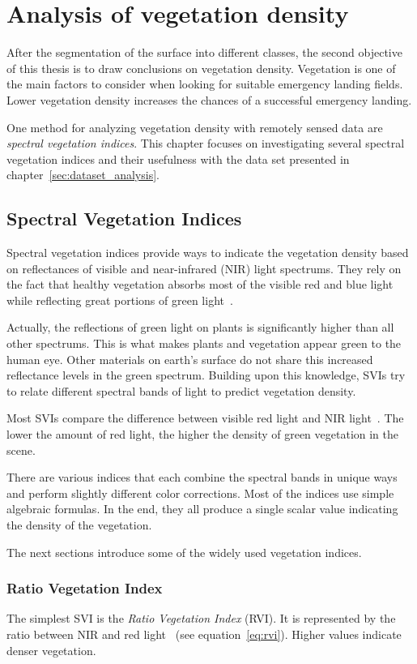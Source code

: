\section{Analysis of vegetation density}
\label{sec:vegetation_analysis}
After the segmentation of the surface into different classes, the second objective of this thesis is to draw conclusions on vegetation density. Vegetation is one of the main factors to consider when looking for suitable emergency landing fields. Lower vegetation density increases the chances of a successful emergency landing.

One method for analyzing vegetation density with remotely sensed data are \emph{spectral vegetation indices}. This chapter focuses on investigating several spectral vegetation indices and their usefulness with the data set presented in chapter~\ref{sec:dataset_analysis}.

\subsection{Spectral Vegetation Indices}
Spectral vegetation indices provide ways to indicate the vegetation density based on reflectances of visible and near-infrared (NIR) light spectrums. They rely on the fact that healthy vegetation absorbs most of the visible red and blue light while reflecting great portions of green light~\cite{glv03}.

Actually, the reflections of green light on plants is significantly higher than all other spectrums. This is what makes plants and vegetation appear green to the human eye. Other materials on earth's surface do not share this increased reflectance levels in the green spectrum. Building upon this knowledge, SVIs try to relate different spectral bands of light to predict vegetation density.

Most SVIs compare the difference between visible red light and NIR light~\cite{glv03}. The lower the amount of red light, the higher the density of green vegetation in the scene.

There are various indices that each combine the spectral bands in unique ways and perform slightly different color corrections. Most of the indices use simple algebraic formulas. In the end, they all produce a single scalar value indicating the density of the vegetation.

The next sections introduce some of the widely used vegetation indices.

\subsubsection{Ratio Vegetation Index}
The simplest SVI is the \emph{Ratio Vegetation Index} (RVI). It is represented by the ratio between NIR and red light~\cite{glv03} (see equation~\ref{eq:rvi}). Higher values indicate denser vegetation.

